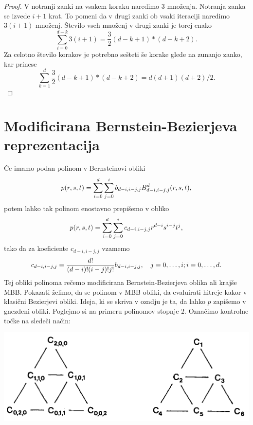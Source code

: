 \documentclass{article}
\begin{document}
\begin{proof}
V notranji zanki na vsakem koraku naredimo $3$ množenja. Notranja zanka se izvede $i+1$ krat. To pomeni da v drugi zanki ob vsaki iteraciji naredimo $3(i+1)$ množenj. Število vseh množenj v drugi zanki je torej enako
$$\sum_{i=0}^{d-k}3(i+1) = \frac{3}{2}(d-k+1)*(d-k+2).$$
Za celotno število korakov je potrebno sešteti še korake glede na zunanjo zanko, kar prinese 
$$\sum_{k=1}^{d}\frac{3}{2}(d-k+1)*(d-k+2) = d(d+1)(d+2)/2.$$
\end{proof}



\section{Modificirana Bernstein-Bezierjeva reprezentacija}

Če imamo podan polinom v Bernsteinovi obliki $$p(r,\\s,\\t) = \sum_{i=0}^{d}\sum_{j=0}^{i}b_{d-i,i-j,j}B_{d-i,i-j,j}^d(r,\\s,\\t),$$
potem lahko tak polinom enostavno prepišemo v obliko
$$p(r,\\s,\\t) = \sum_{i=0}^{d}\sum_{j=0}^{i}c_{d-i,i-j,j}r^{d-i}s^{i-j}t^j,$$
tako da za koeficiente $c_{d-i,i-j,j}$ vzamemo
$$c_{d-i,i-j,j} = \frac{d!}{(d-i)!(i-j)!j!}b_{d-i,i-j,j}, \quad j=0,\ldots, i;\\ i = 0,\ldots,d.$$
Tej obliki polinoma rečemo modificirana Bernstein-Bezierjeva oblika ali krajše MBB. Pokazati želimo, da se polinom v MBB obliki, da evaluirati hitreje kakor v klasični Bezierjevi obliki. Ideja, ki se skriva v ozadju je ta, da lahko $p$ zapišemo v gnezdeni obliki. Poglejmo si na primeru polinomov stopnje $2$. Označimo kontrolne točke na sledeči način:

\begin{center}
\includegraphics[width=.9\linewidth]{graf.png}
\end{center}
\end{document}
